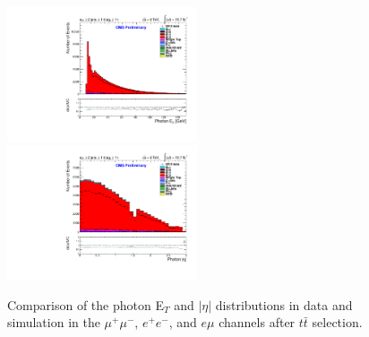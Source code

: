 \begin{figure}
\includegraphics[width=0.5\textwidth]{Plots/ControlPlots/TTbarDiLeptonAnalysis/EMu/Photons/AllPhotons/Photon_ET_splitTTbar_ratio.pdf}
\includegraphics[width=0.5\textwidth]{Plots/ControlPlots/TTbarDiLeptonAnalysis/EMu/Photons/AllPhotons/Photon_AbsEta_splitTTbar_ratio.pdf}
\caption{Comparison of the photon E$_{T}$ and $|\eta|$ distributions in data and simulation in the $\mu^{+}\mu^{-}$, $e^{+}e^{-}$, and $e\mu$ channels after $t\bar{t}$ selection.}
\label{fig-ttbarETandEta}
\end{figure}

